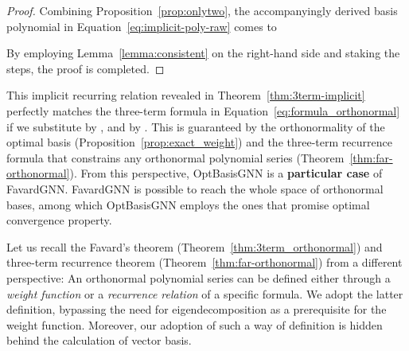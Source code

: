 \begin{proof}
Combining Proposition~\ref{prop:onlytwo}, 
the accompanyingly derived basis polynomial in Equation~\eqref{eq:implicit-poly-raw} comes to 

By employing Lemma~\ref{lemma:consistent} on the right-hand side 
and staking the steps, 
the proof is completed.
\end{proof}

This implicit recurring relation revealed in Theorem~\ref{thm:3term-implicit} perfectly matches the three-term formula in Equation~\eqref{eq:formula_orthonormal} 
if we substitute  by , 
and  by . 
This is guaranteed by the orthonormality of the optimal basis 
(Proposition~\ref{prop:exact_weight}) 
and the three-term recurrence formula that constrains any orthonormal polynomial series (Theorem~\ref{thm:far-orthonormal}). 
From this perspective,
OptBasisGNN is a \textbf{particular case} of FavardGNN. 
FavardGNN is possible to reach the whole space of orthonormal bases, 
among which OptBasisGNN employs the ones that promise optimal convergence property.

Let us recall the Favard's theorem (Theorem~\ref{thm:3term_orthonormal}) and three-term recurrence theorem (Theorem~\ref{thm:far-orthonormal})
from a different perspective: 
An orthonormal polynomial series can be defined either through a \textit{weight function} or a \textit{recurrence relation} of a specific formula. 
We adopt the latter definition,    
bypassing the need for eigendecomposition as a prerequisite for the weight function.
Moreover, our adoption of such a way of definition is hidden behind the calculation of vector basis.
 





